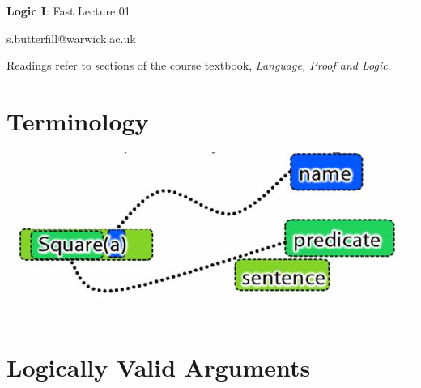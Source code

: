 \documentclass[12pt]{extarticle}
\date{}
\makeatletter
\def \ititle {Origins of Mind}
\def \isubtitle {Lecture 08}
\def \iemail{s.butterfill@warwick.ac.uk}
\makeatother
\begin{document}

\begin{multicols*}{3}

\setlength\footnotesep{1em}








\def \ititle {Logic I}
 
\def \isubtitle {Fast Lecture 01}
 
\begin{center}
 
{\Large
 
\textbf{\ititle}: \isubtitle
 
}
 
 
 
\iemail %
 
\end{center}
 
Readings refer to sections of the course textbook, \emph{Language, Proof and Logic}.
 
 
 
\section{Terminology}
 
\begin{center}
\includegraphics[scale=0.3]{img/name_predicate_sentence.png}
\end{center}
 
 
\section{Logically Valid Arguments}
 

\end{multicols*}
\end{document}
